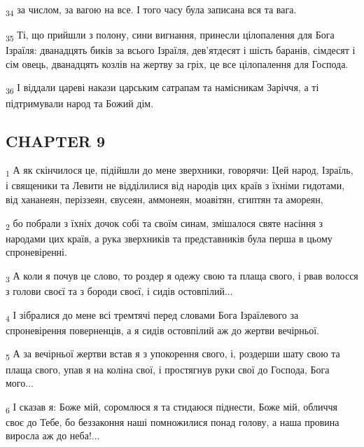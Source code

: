 \begin{tcolorbox}
\textsubscript{34} за числом, за вагою на все. І того часу була записана вся та вага.
\end{tcolorbox}
\begin{tcolorbox}
\textsubscript{35} Ті, що прийшли з полону, сини вигнання, принесли цілопалення для Бога Ізраїля: дванадцять биків за всього Ізраїля, дев'ятдесят і шість баранів, сімдесят і сім овець, дванадцять козлів на жертву за гріх, це все цілопалення для Господа.
\end{tcolorbox}
\begin{tcolorbox}
\textsubscript{36} І віддали цареві накази царським сатрапам та намісникам Заріччя, а ті підтримували народ та Божий дім.
\end{tcolorbox}
\subsection{CHAPTER 9}
\begin{tcolorbox}
\textsubscript{1} А як скінчилося це, підійшли до мене зверхники, говорячи: Цей народ, Ізраїль, і священики та Левити не відділилися від народів цих країв з їхніми гидотами, від хананеян, періззеян, євусеян, аммонеян, моавітян, єгиптян та амореян,
\end{tcolorbox}
\begin{tcolorbox}
\textsubscript{2} бо побрали з їхніх дочок собі та своїм синам, змішалося святе насіння з народами цих країв, а рука зверхників та представників була перша в цьому спроневіренні.
\end{tcolorbox}
\begin{tcolorbox}
\textsubscript{3} А коли я почув це слово, то роздер я одежу свою та плаща свого, і рвав волосся з голови своєї та з бороди своєї, і сидів остовпілий...
\end{tcolorbox}
\begin{tcolorbox}
\textsubscript{4} І зібралися до мене всі тремтячі перед словами Бога Ізраїлевого за спроневірення поверненців, а я сидів остовпілий аж до жертви вечірньої.
\end{tcolorbox}
\begin{tcolorbox}
\textsubscript{5} А за вечірньої жертви встав я з упокорення свого, і, роздерши шату свою та плаща свого, упав я на коліна свої, і простягнув руки свої до Господа, Бога мого...
\end{tcolorbox}
\begin{tcolorbox}
\textsubscript{6} І сказав я: Боже мій, соромлюся я та стидаюся піднести, Боже мій, обличчя своє до Тебе, бо беззаконня наші помножилися понад голову, а наша провина виросла аж до неба!...
\end{tcolorbox}
